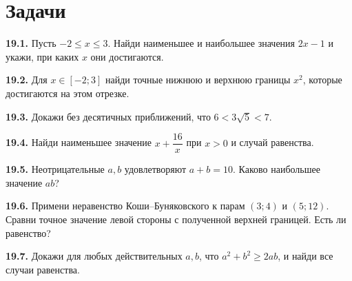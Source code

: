 \section*{Задачи}
\begingroup\setlength{\parskip}{2pt}
\noindent\begin{minipage}[t]{\linewidth}\textbf{19.1.} Пусть \(-2\le x\le3\). Найди наименьшее и наибольшее значения \(2x-1\) и укажи, при каких \(x\) они достигаются.\par\end{minipage}\par
\noindent\begin{minipage}[t]{\linewidth}\textbf{19.2.} Для \(x\in[-2;3]\) найди точные нижнюю и верхнюю границы \(x^2\), которые достигаются на этом отрезке.\par\end{minipage}\par
\noindent\begin{minipage}[t]{\linewidth}\textbf{19.3.} Докажи без десятичных приближений, что \(6<3\sqrt5<7\).\par\end{minipage}\par
\noindent\begin{minipage}[t]{\linewidth}\textbf{19.4.} Найди наименьшее значение \(x+\dfrac{16}{x}\) при \(x>0\) и случай равенства.\par\end{minipage}\par
\noindent\begin{minipage}[t]{\linewidth}\textbf{19.5.} Неотрицательные \(a,b\) удовлетворяют \(a+b=10\). Каково наибольшее значение \(ab\)?\par\end{minipage}\par
\noindent\begin{minipage}[t]{\linewidth}\textbf{19.6.} Примени неравенство Коши--Буняковского к парам \((3;4)\) и \((5;12)\). Сравни точное значение левой стороны с полученной верхней границей. Есть ли равенство?\par\end{minipage}\par
\noindent\begin{minipage}[t]{\linewidth}\textbf{19.7.} Докажи для любых действительных \(a,b\), что \(a^2+b^2\ge2ab\), и найди все случаи равенства.\par\end{minipage}\par
